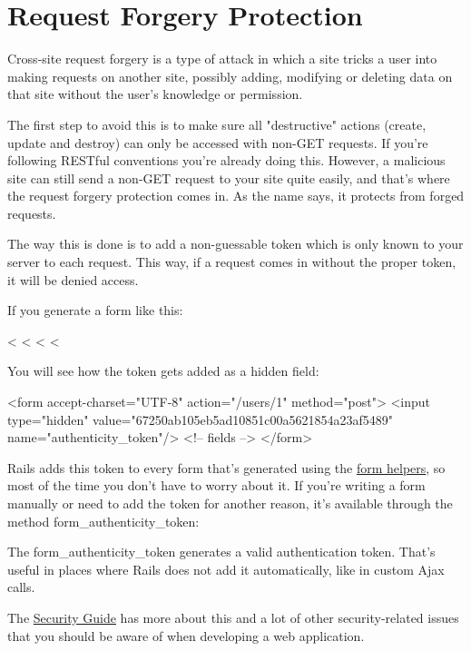 \documentclass[10pt]{book}
\newenvironment{code}{%
  \scriptsize
    \verbatim
}{%
    \endverbatim
    \newline
}
\begin{document}
\section{ Request Forgery Protection}

Cross-site request forgery is a type of attack in which a site tricks  a user into making requests on another site, possibly adding, modifying  or deleting data on that site without the user’s knowledge or  permission.

The first step to avoid this is to make sure all "destructive"  actions (create, update and destroy) can only be accessed with non-GET requests. If you’re following RESTful conventions you’re already doing this. However, a malicious site can still send a non-GET  request to your site quite easily, and that’s where the request forgery  protection comes in. As the name says, it protects from forged  requests.

The way this is done is to add a non-guessable token which is only  known to your server to each request. This way, if a request comes in  without the proper token, it will be denied access.

If you generate a form like this:
\begin{code}
<%
  <%
  <%
<%
\end{code}

You will see how the token gets added as a hidden field:
\begin{code}
<form accept-charset="UTF-8" action="/users/1" method="post">
<input type="hidden"
       value="67250ab105eb5ad10851c00a5621854a23af5489"
       name="authenticity_token"/>
<!-- fields -->
</form>
\end{code}

Rails adds this token to every form that’s generated using the \href{http://guides.rubyonrails.org/form_helpers.html}{form helpers},  so most of the time you don’t have to worry about it. If you’re writing  a form manually or need to add the token for another reason, it’s  available through the method form\_authenticity\_token:

The form\_authenticity\_token generates a valid authentication  token. That’s useful in places where Rails does not add it  automatically, like in custom Ajax calls.

The \href{http://guides.rubyonrails.org/security.html}{Security Guide} has more about this and a lot of other security-related issues that you should be aware of when developing a web application.
\end{document}
